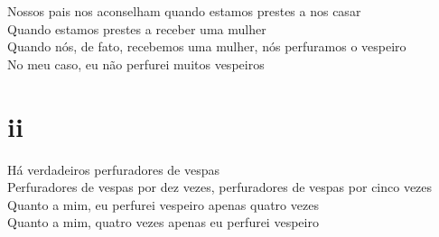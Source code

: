 \begin{linenumbers}\begingroup\raggedright
 
\noindent Nossos pais nos aconselham quando estamos prestes a nos casar\\
 Quando estamos prestes a receber uma mulher\\
 Quando nós, de fato, recebemos uma mulher, nós perfuramos o vespeiro\\
 No meu caso, eu não perfurei muitos vespeiros
 
 
\medskip
\section{ii}

 \noindent Há verdadeiros perfuradores de vespas\\
 Perfuradores de vespas por dez vezes, perfuradores de vespas por cinco vezes\\
 Quanto a mim, eu perfurei vespeiro apenas quatro vezes\\
 Quanto a mim, quatro vezes apenas eu perfurei vespeiro
 
\end{linenumbers}\endgroup

\bigskip

